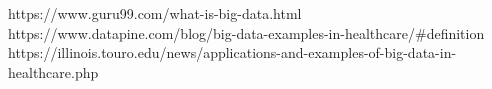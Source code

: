 https://www.guru99.com/what-is-big-data.html
https://www.datapine.com/blog/big-data-examples-in-healthcare/#definition
https://illinois.touro.edu/news/applications-and-examples-of-big-data-in-healthcare.php